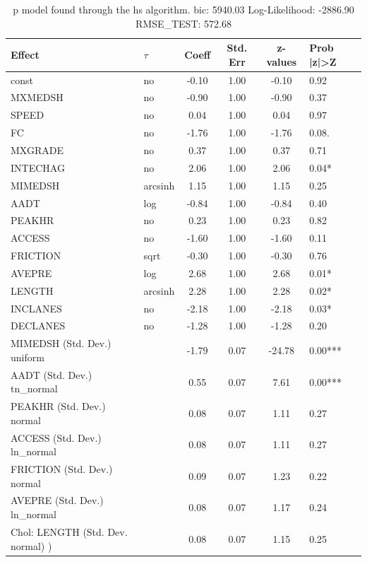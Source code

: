 \begin{table}
	\caption{p model found through the hs algorithm. bic: 5940.03 Log-Likelihood: -2886.90 RMSE_TEST: 572.68}
	\begin{center}
		\begin{tabular}{|l|l|c|c|c|l|}
			\hline
			Effect & $\tau$ & Coeff & Std. Err & z-values & Prob |z|>Z \\
			\hline
			const & no & -0.10 & 1.00 & -0.10 & 0.92 \\
			\hline
			MXMEDSH & no & -0.90 & 1.00 & -0.90 & 0.37 \\
			\hline
			SPEED & no & 0.04 & 1.00 & 0.04 & 0.97 \\
			\hline
			FC & no & -1.76 & 1.00 & -1.76 & 0.08. \\
			\hline
			MXGRADE & no & 0.37 & 1.00 & 0.37 & 0.71 \\
			\hline
			INTECHAG & no & 2.06 & 1.00 & 2.06 & 0.04* \\
			\hline
			MIMEDSH & arcsinh & 1.15 & 1.00 & 1.15 & 0.25 \\
			\hline
			AADT & log & -0.84 & 1.00 & -0.84 & 0.40 \\
			\hline
			PEAKHR & no & 0.23 & 1.00 & 0.23 & 0.82 \\
			\hline
			ACCESS & no & -1.60 & 1.00 & -1.60 & 0.11 \\
			\hline
			FRICTION & sqrt & -0.30 & 1.00 & -0.30 & 0.76 \\
			\hline
			AVEPRE & log & 2.68 & 1.00 & 2.68 & 0.01* \\
			\hline
			LENGTH & arcsinh & 2.28 & 1.00 & 2.28 & 0.02* \\
			\hline
			INCLANES & no & -2.18 & 1.00 & -2.18 & 0.03* \\
			\hline
			DECLANES & no & -1.28 & 1.00 & -1.28 & 0.20 \\
			\hline
			MIMEDSH (Std. Dev.) uniform &  & -1.79 & 0.07 & -24.78 & 0.00*** \\
			\hline
			AADT (Std. Dev.) tn_normal &  & 0.55 & 0.07 & 7.61 & 0.00*** \\
			\hline
			PEAKHR (Std. Dev.) normal &  & 0.08 & 0.07 & 1.11 & 0.27 \\
			\hline
			ACCESS (Std. Dev.) ln_normal &  & 0.08 & 0.07 & 1.11 & 0.27 \\
			\hline
			FRICTION (Std. Dev.) normal &  & 0.09 & 0.07 & 1.23 & 0.22 \\
			\hline
			AVEPRE (Std. Dev.) ln_normal &  & 0.08 & 0.07 & 1.17 & 0.24 \\
			\hline
			 Chol: LENGTH (Std. Dev. normal) ) &  & 0.08 & 0.07 & 1.15 & 0.25 \\

\end{tabular}
\end{center}
\end{table}
